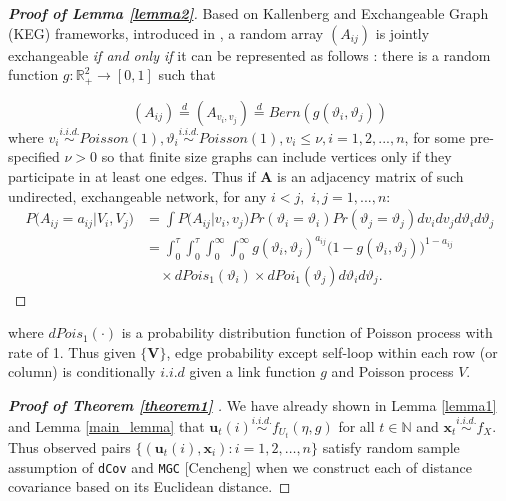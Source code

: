 \documentclass[12pt]{article}
\theoremstyle{definition}
\begin{document}
\begin{proof}[\textbf{Proof of Lemma \ref{lemma2}}]
	Based on Kallenberg and Exchangeable Graph (KEG) frameworks, introduced in \cite{veitch2015class}, a random array $(A_{ij})$ is jointly exchangeable \textit{if and only if} it can be represented as follows : there is a random function $g : \mathbb{R}^{2}_{+} \rightarrow [0,1]$ such that 
	
	\begin{equation}
	(A_{ij})  \stackrel{d}{=} (A_{v_{i}, v_{j}} )  \stackrel{d}{=} Bern( g( \vartheta_{i}, \vartheta_{j}))
	\end{equation}
	where $v_{i} \overset{i.i.d.}{\sim} Poisson(1), \vartheta_{i} \overset{i.i.d.}{\sim} Poisson(1), v_{i} \leq \nu, i = 1,2,... , n$, for some pre-specified $\nu >0$ so that finite size graphs can include vertices only if they participate in at least one edges. Thus if $\mathbf{A}$ is an adjacency matrix of such undirected, exchangeable network, for any $i < j,$ $i,j = 1,... , n$:
\begin{equation}
\begin{split}
	P \big(  A_{ij} = a_{ij} \big| V_{i}, V_{j} \big) & = \int P \big( A_{ij} \big| v_{i}, v_{j} \big) Pr(\vartheta_{i} = \vartheta_{i}) Pr(\vartheta_{j} = \vartheta_{j})   dv_{i} dv_{j} d\vartheta_{i} d\vartheta_{j}   \\ & = \int_{0}^{\tau} \int_{0}^{\tau}   \int_{0}^{\infty} \int_{0}^{\infty}  g( \vartheta_{i},  \vartheta_{j})^{a_{ij}} \big( 1- g( \vartheta_{i},  \vartheta_{j}) \big)^{1-a_{ij}}  \\ & \quad \times dPois_{1}(\vartheta_{i}) \times dPoi_{1}(\vartheta_{j})  d \vartheta_{i} d \vartheta_{j}.
\end{split}
\end{equation}
\end{proof}
where $dPois_{1}(\cdot)$ is a probability distribution function of Poisson process with rate of 1.  Thus given $\{ \mathbf{V} \}$, edge probability except self-loop within each row (or column) is conditionally $\textit{i.i.d}$ given a link function $g$ and Poisson process $V$.


	
\begin{proof}[\textbf{Proof of Theorem \ref{theorem1} }]
We have already shown in Lemma \ref{lemma1} and Lemma \ref{main_lemma} that $ \mathbf{u}_{t}(i) \overset{i.i.d.}{\sim} f_{U_{t}}(\eta, g)$ for all $t \in \mathbb{N}$ and $\mathbf{x}_{t} \overset{i.i.d.}{\sim} f_{X}$. Thus observed pairs $\{ ( \mathbf{u}_{t}(i), \mathbf{x}_{i}  ) : i =1,2, \ldots, n \}$ satisfy random sample assumption of \texttt{dCov} \citep{szekely2013energy} and \texttt{MGC} [Cencheng] when we construct each of distance covariance based on its Euclidean distance.  
\end{proof}
\end{document}
